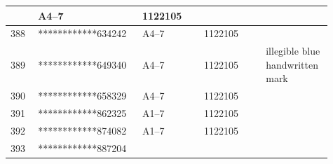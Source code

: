 \documentclass[UTF8,10pt,a4paper,fontset=fandol]{ctexart}
\newcommand{\fieldvalue}[1]{#1}
\newcommand{\handwritten}[1]{#1}
\begin{document}
\begin{center}
\begin{tabular}{|p{0.08\linewidth}|p{0.29\linewidth}|p{0.18\linewidth}|p{0.18\linewidth}|p{0.18\linewidth}|}
&
\fieldvalue{A4--7}
&
\fieldvalue{1122105}
& \\ \hline
\fieldvalue{388}
&
\fieldvalue{************634242}
&
\fieldvalue{A4--7}
&
\fieldvalue{1122105}
& \\ \hline
\fieldvalue{389}
&
\fieldvalue{************649340}
&
\fieldvalue{A4--7}
&
\fieldvalue{1122105}
&
\handwritten{illegible blue handwritten mark}
\\ \hline
\fieldvalue{390}
&
\fieldvalue{************658329}
&
\fieldvalue{A4--7}
&
\fieldvalue{1122105}
& \\ \hline
\fieldvalue{391}
&
\fieldvalue{************862325}
&
\fieldvalue{A1--7}
&
\fieldvalue{1122105}
& \\ \hline
\fieldvalue{392}
&
\fieldvalue{************874082}
&
\fieldvalue{A1--7}
&
\fieldvalue{1122105}
& \\ \hline
\fieldvalue{393}
&
\fieldvalue{************887204}
&

\end{tabular}
\end{center}
\end{document}
